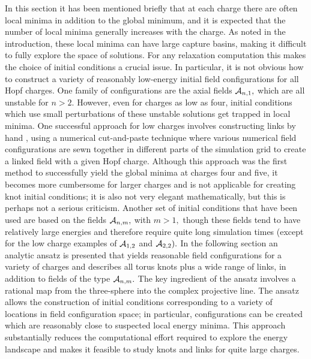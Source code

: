 \documentclass[12pt]{article}
\begin{document}
In this section it has been mentioned briefly that at each charge
there are often local minima in addition to the global minimum, and
it is expected that the number of local minima generally increases
with the charge. As noted in the introduction, these local minima
can have large capture basins, making it difficult to fully explore
the space of solutions. For any relaxation computation this makes
the choice of initial conditions a crucial issue. In particular, it
is not obvious how to construct a variety of 
reasonably low-energy initial field
configurations for all Hopf charges. One family of configurations
are the axial fields ${\cal A}_{n,1},$ which are all unstable for
$n>2.$ However, even for charges as low as four, initial conditions
which use small perturbations of these unstable solutions get
trapped in local minima. One successful approach for low charges
involves constructing links by hand \cite{HS,HS2}, using a numerical
cut-and-paste technique where various numerical field configurations
are sewn together in different parts of the simulation grid to
create a linked field with a given Hopf charge. Although this
approach was the first method to successfully yield the global
minima at charges four and five, it becomes more cumbersome for
larger charges and is not applicable for creating knot initial
conditions; it is also not very elegant mathematically, but this is
perhaps not a serious criticism. Another set of initial conditions
that have been used \cite{HS2} are based on the fields ${\cal
A}_{n,m},$ with $m>1,$ though these fields tend to have relatively
large energies and therefore require quite long simulation times
(except for the low charge examples of ${\cal A}_{1,2}$ and ${\cal
A}_{2,2}).$ In the following section an analytic ansatz is presented
that yields reasonable field configurations for a variety of charges
and describes all torus knots plus a wide range of links, in addition
to fields of the type ${\cal A}_{n,m}.$ The key ingredient of the ansatz
involves a rational map from the three-sphere into the complex
projective line. The ansatz allows the construction of initial
conditions corresponding to a variety of locations in field
configuration space; in particular, configurations can be created
which are reasonably close to suspected local energy minima. This
approach substantially reduces the computational effort required to
explore the energy landscape and makes it feasible to study knots
and links for quite large charges.
\end{document}
